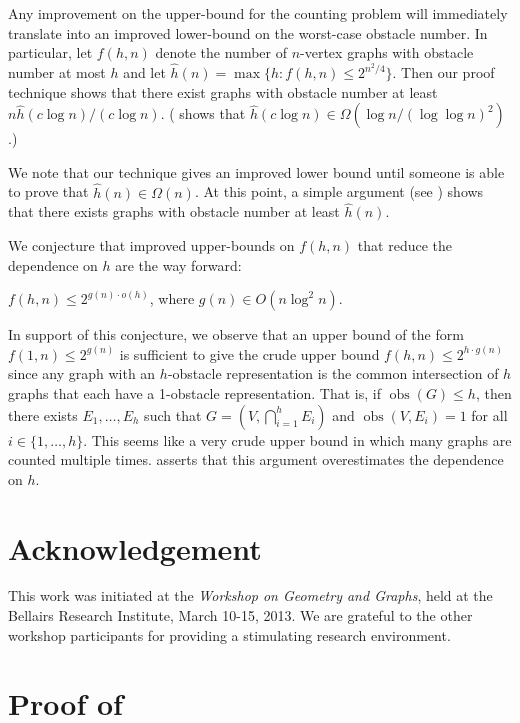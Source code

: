 \documentclass{patmorin}
\DeclareMathOperator{\obs}{obs}
\begin{document}
Any improvement on the upper-bound for the counting problem will
immediately translate into an improved lower-bound on the worst-case
obstacle number.  In particular, let $f(h,n)$ denote the number of
$n$-vertex graphs with obstacle number at most $h$ and let $\hat h(n)
= \max\{h:f(h,n) \le 2^{n^2/4}\}$.  Then our proof technique shows
that there exist graphs with obstacle number at least $n\hat{h}(c\log
n)/(c\log n)$. ( shows that $\hat{h}(c\log n)\in\Omega(\log n/(\log\log n)^2)$.)

We note that our technique gives an improved lower bound until someone is
able to prove that $\hat h(n)\in\Omega(n)$.  At this point, a simple
argument (see \cite[Theorem~3]{mukkamala.pach.ea:graphs}) shows that
there exists graphs with obstacle number at least $\hat{h}(n)$.

We conjecture that improved upper-bounds on $f(h,n)$ that reduce the
dependence on $h$ are the way forward:
\begin{conj}
  $f(h,n) \le 2^{g(n)\cdot o(h)}$, where $g(n)\in O(n\log^2 n)$.
\end{conj}
In support of this conjecture, we observe that an upper bound of the
form $f(1,n)\le 2^{g(n)}$ is sufficient to give the crude upper bound
$f(h,n)\le 2^{h\cdot g(n)}$ since any graph with an $h$-obstacle
representation is the common intersection of $h$ graphs that each
have a 1-obstacle representation.  That is, if $\obs(G)\le h$, then
there exists $E_1,\ldots,E_h$ such that $G=(V,\bigcap_{i=1}^h E_i)$
and $\obs(V,E_i)=1$ for all $i\in \{1,\ldots,h\}$.  This seems like a
very crude upper bound in which many graphs are counted multiple times.
 asserts that this argument overestimates the dependence on $h$.


\section*{Acknowledgement}

This work was initiated at the \emph{Workshop on Geometry and Graphs},
held at the Bellairs Research Institute, March 10-15, 2013.  We are
grateful to the other workshop participants for providing a stimulating
research environment.





\appendix

\section{Proof of }
\end{document}
